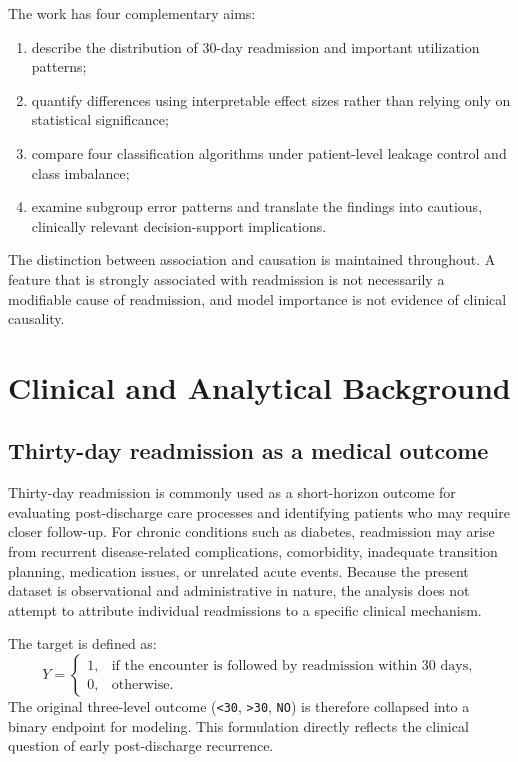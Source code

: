 \documentclass[10pt,a4paper]{article}
\begin{document}
The work has four complementary aims:
\begin{enumerate}[leftmargin=1.2cm]
\item describe the distribution of 30-day readmission and important utilization patterns;
\item quantify differences using interpretable effect sizes rather than relying only on statistical significance;
\item compare four classification algorithms under patient-level leakage control and class imbalance;
\item examine subgroup error patterns and translate the findings into cautious, clinically relevant decision-support implications.
\end{enumerate}

The distinction between association and causation is maintained throughout. A feature that is strongly associated with readmission is not necessarily a modifiable cause of readmission, and model importance is not evidence of clinical causality.

\section{Clinical and Analytical Background}

\subsection{Thirty-day readmission as a medical outcome}

Thirty-day readmission is commonly used as a short-horizon outcome for evaluating post-discharge care processes and identifying patients who may require closer follow-up. For chronic conditions such as diabetes, readmission may arise from recurrent disease-related complications, comorbidity, inadequate transition planning, medication issues, or unrelated acute events. Because the present dataset is observational and administrative in nature, the analysis does not attempt to attribute individual readmissions to a specific clinical mechanism.

The target is defined as:
\[
Y =
\begin{cases}
1, & \text{if the encounter is followed by readmission within 30 days},\\
0, & \text{otherwise}.
\end{cases}
\]
The original three-level outcome (\texttt{<30}, \texttt{>30}, \texttt{NO}) is therefore collapsed into a binary endpoint for modeling. This formulation directly reflects the clinical question of early post-discharge recurrence.
\end{document}
